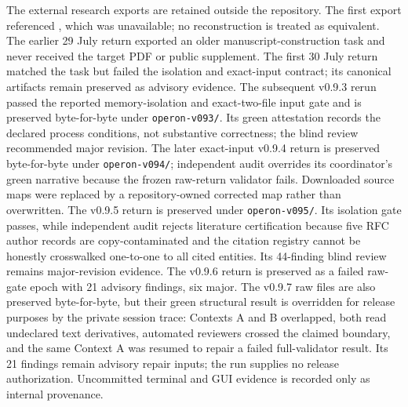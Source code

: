 \documentclass[11pt]{article}
\newcommand{\code}[1]{\texttt{#1}}
\begin{document}
The external research exports are retained outside the repository.  The first
export referenced , which was unavailable; no
reconstruction is treated as equivalent.  The earlier 29 July return exported
an older manuscript-construction task and never received the target PDF or
public supplement. The first 30 July return matched the task but failed the
isolation and exact-input contract; its canonical artifacts remain preserved
as advisory evidence. The subsequent v0.9.3 rerun passed the reported
memory-isolation and exact-two-file input gate and is preserved byte-for-byte
under \code{operon-v093/}. Its green attestation records the declared process
conditions, not substantive correctness; the blind review recommended major
revision. The later exact-input v0.9.4 return is preserved byte-for-byte under
\code{operon-v094/}; independent audit overrides its coordinator's green
narrative because the frozen raw-return validator fails. Downloaded source maps
were replaced by a repository-owned corrected map rather than overwritten.
The v0.9.5 return is preserved under \code{operon-v095/}. Its isolation gate
passes, while independent audit rejects literature certification because five
RFC author records are copy-contaminated and the citation registry cannot be
honestly crosswalked one-to-one to all cited entities. Its 44-finding blind
review remains major-revision evidence.
The v0.9.6 return is preserved as a failed raw-gate epoch with 21 advisory
findings, six major. The v0.9.7 raw files are also preserved byte-for-byte, but
their green structural result is overridden for release purposes by the private
session trace: Contexts A and B overlapped, both read undeclared text
derivatives, automated reviewers crossed the claimed boundary, and the same
Context A was resumed to repair a failed full-validator result. Its 21 findings
remain advisory repair inputs; the run supplies no release authorization.
Uncommitted terminal and GUI evidence is recorded only as internal provenance.
\end{document}
